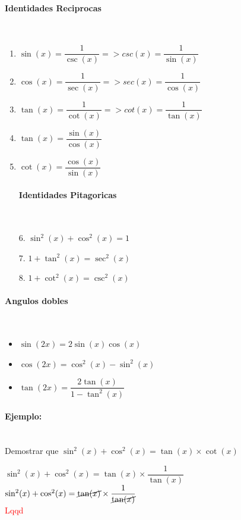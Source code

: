 \documentclass[stu, 12pt, letterpaper, donotrepeattitle, floatsintext, natbib]{apa7}
\begin{document}
    \begin{paracol}{2}
        \paragraph{Identidades Reciprocas}\\
        \begin{enumerate}
            \item $\sin(x) = \dfrac{1}{\csc(x)} => csc(x) = \dfrac{1}{\sin(x)}$
            \item $\cos(x) = \dfrac{1}{\sec(x)} => sec(x) = \dfrac{1}{\cos(x)}$
            \item $\tan(x) = \dfrac{1}{\cot(x)} => cot(x) = \dfrac{1}{\tan(x)}$

            \item $\tan(x) = \dfrac{\sin(x)}{\cos(x)}$
            \item $\cot(x) = \dfrac{\cos(x)}{\sin(x)}$

            \switchcolumn

            \paragraph{Identidades Pitagoricas}\\
            \item[6.] $\sin^2(x) + \cos^2(x) = 1$
            \item[7.] $1 + \tan^2(x) = \sec^2(x)$
            \item[8.] $1 + \cot^2(x) = \csc^2(x)$
        \end{enumerate}
    \end{paracol}

    \paragraph{Angulos dobles}\\
    \begin{itemize}
        \item $\sin(2x) = 2\sin(x)\cos(x)$
        \item $\cos(2x) = \cos^2(x) - \sin^2(x)$
        \item $\tan(2x) = \dfrac{2\tan(x)}{1-\tan^2(x)}$
    \end{itemize}

    \paragraph{Ejemplo:}\\
    Demostrar que $\sin^2(x) + \cos^2(x) = \tan(x) \times \cot(x)$\\[0.5cm]
    \begin{paracol}{2}
        $\sin^2(x) + \cos^2(x) = \tan(x) \times \dfrac{1}{\tan(x)}$\\[0.5cm]
        $\sin^2(x) + \cos^2(x) = \cancel{\tan(x)} \times \dfrac{1}{\cancel{\tan(x)}}$\\[0.5cm]
        \switchcolumn
        \textcolor{red}{Lqqd} 
    \end{paracol}
    \newpage
\end{document}
